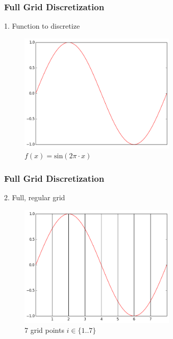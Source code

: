 \begin{frame}
  \frametitle{Full Grid Discretization}
  \vspace{-10px}
  \begin{block}{1. Function to discretize}
    \begin{figure}[!htp]

      \centering
      \includegraphics[width=7.5cm]{images/singlebasis_1}
      \vspace{-12px}
      \caption{$f(x) =\text{sin}(2\pi \cdot x)$}
    \end{figure}
  \end{block}
\end{frame}

\begin{frame}
  \frametitle{Full Grid Discretization}
  \topline
  \vspace{-10px}
  \begin{block}{2. Full, regular grid}
    \begin{figure}[!htp]

      \centering
      \includegraphics[width=7.5cm]{images/singlebasis_2}
      \vspace{-12px}
      \caption{7 grid points $i \in \{1..7\}$}
    \end{figure}
  \end{block}
\end{frame}

